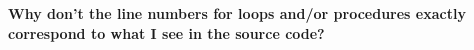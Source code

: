 \documentclass{article}
\begin{document}
\begin{comment}
   possible question: What happens if I forget to run hpcstruct?  
No hpcstruct = 
   really crazy procedure & loop bounds
   no inlining detection!
\end{comment}

\textbf{Why don't the line numbers for loops and/or procedures exactly
correspond to what I see in the source code?}
\begin{comment}
  Wipe MIPSpro, Compaq compiler

PGI associates 1 line / basic block, so info is limited

Intel and GCC have, in our experience produced the best.

See hpcstruct manpage.

hpcviewer help is good idea.
\end{comment}
\end{document}
